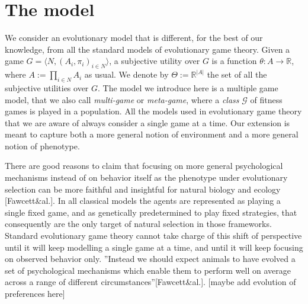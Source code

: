 \documentclass[fleqn,reqno,11pt]{article}
\begin{document}
\newpage

\section{The model}
\label{sec:model}


We consider an evolutionary model that is different, for the best of our knowledge, from all
the standard models of evolutionary game theory. Given a game
$ G=\langle N, (A_i , \pi_i)_{i \in N} \rangle $, a subjective utility over $G$ is a function
$\theta: A \rightarrow \mathbb{R} $, where $ A:=\prod_{i\in N}A_{i} $ as usual. We denote by
$ \Theta:= \mathbb{R}^{|A|} $ the set of all the subjective utilities over $G$. The model we
introduce here is a multiple game model, that we also call \textit{multi-game} or
\textit{meta-game}, where a \textit{class} $\mathcal{G}$ of fitness games is played in a
population. All the models used in evolutionary game theory that we are aware of always
consider a single game at a time.  Our extension is meant
to capture both a more general notion of environment and a more general notion of phenotype.
 
There are good reasons to claim that focusing on more general psychological mechanisms instead
of on behavior itself as the phenotype under evolutionary selection can be more faithful and
insightful for natural biology and ecology [Fawcett\&al.].  In all classical models the agents
are represented as playing a single fixed game, and as genetically predetermined to play fixed
strategies, that consequently are the only target of natural selection in those
frameworks. Standard evolutionary game theory cannot take charge of this shift of perspective
until it will keep modelling a single game at a time, and until it will keep focusing on
observed behavior only. ''Instead we should expect animals to have evolved a set of
psychological mechanisms which enable them to perform well on average across a range of
different circumstances''[Fawcett\&al.]. [maybe add evolution of preferences here]
\end{document}
